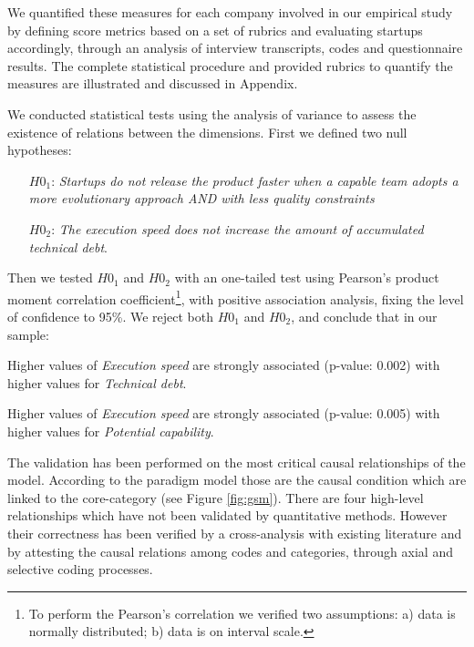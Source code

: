 \documentclass[10pt,journal,letterpaper,compsoc]{IEEEtran}
\begin{document}
We quantified these measures for each company involved in our empirical study 
by defining score metrics based on a set of rubrics and evaluating startups 
accordingly, through an analysis of interview transcripts, codes and 
questionnaire results. The complete statistical procedure and provided rubrics 
to quantify the measures are illustrated and discussed in Appendix.

We conducted statistical tests  using the analysis of variance to assess the 
existence of relations between the dimensions. First we defined two null 
hypotheses: 

\begin{itemize}
\item[$H0_1$:] \textit{Startups do not release the product faster 
when a capable team adopts a more evolutionary approach AND with less quality 
constraints}
\item[$H0_2$:] \textit{The execution speed does not increase the amount 
of accumulated technical debt}. 
\end{itemize}

Then we tested $H0_1$ and $H0_2$  with an 
one-tailed test using Pearson's product moment correlation 
coefficient\footnote{To perform the Pearson's correlation we verified two 
assumptions: a) data is normally distributed; b) data is on interval scale.}, 
with positive association analysis, fixing the level of confidence to 95\%.
We reject both $H0_1$ and $H0_2$, and conclude that in our sample:
\begin{compactenum}
\item Higher values of \textit{Execution speed} are strongly associated 
(p-value: 0.002) with higher values for \textit{Technical debt}.

\item Higher values of \textit{Execution speed} are 
strongly associated (p-value: 0.005) with higher values for  
\textit{Potential capability}.
\end{compactenum}

The validation has been performed on the most critical  causal relationships of 
the model. According to the paradigm model those are the causal condition which 
are linked to the core-category (see Figure \ref{fig:gsm}). There are four 
high-level relationships  which have not been validated by quantitative 
methods. However their correctness has been verified by a cross-analysis with 
existing literature and by attesting the causal relations among codes and 
categories, through axial and selective coding processes. 
\end{document}
